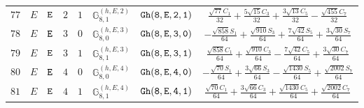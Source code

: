 \documentclass[fleqn,8pt]{jsarticle}
\begin{document}
\begin{table}[ht!]
\begin{center}
\begin{tabular}{cccccccc}
$ 77 $ & $ E $ & $ {\tt E} $ & $ 2 $ & $ 1 $ & $ \mathbb{G}_{8,1}^{(h,E,2)} $ & $ {\tt Gh(8,E,2,1)} $ & $ \frac{\sqrt{77} C_{1}}{32} + \frac{5 \sqrt{15} C_{3}}{32} + \frac{3 \sqrt{13} C_{5}}{32} - \frac{\sqrt{455} C_{7}}{32} $ \\
$ 78 $ & $ E $ & $ {\tt E} $ & $ 3 $ & $ 0 $ & $ \mathbb{G}_{8,0}^{(h,E,3)} $ & $ {\tt Gh(8,E,3,0)} $ & $ - \frac{\sqrt{858} S_{1}}{64} + \frac{\sqrt{910} S_{3}}{64} + \frac{7 \sqrt{42} S_{5}}{64} + \frac{3 \sqrt{30} S_{7}}{64} $ \\
$ 79 $ & $ E $ & $ {\tt E} $ & $ 3 $ & $ 1 $ & $ \mathbb{G}_{8,1}^{(h,E,3)} $ & $ {\tt Gh(8,E,3,1)} $ & $ \frac{\sqrt{858} C_{1}}{64} + \frac{\sqrt{910} C_{3}}{64} - \frac{7 \sqrt{42} C_{5}}{64} + \frac{3 \sqrt{30} C_{7}}{64} $ \\
$ 80 $ & $ E $ & $ {\tt E} $ & $ 4 $ & $ 0 $ & $ \mathbb{G}_{8,0}^{(h,E,4)} $ & $ {\tt Gh(8,E,4,0)} $ & $ - \frac{\sqrt{70} S_{1}}{64} + \frac{3 \sqrt{66} S_{3}}{64} - \frac{\sqrt{1430} S_{5}}{64} + \frac{\sqrt{2002} S_{7}}{64} $ \\
$ 81 $ & $ E $ & $ {\tt E} $ & $ 4 $ & $ 1 $ & $ \mathbb{G}_{8,1}^{(h,E,4)} $ & $ {\tt Gh(8,E,4,1)} $ & $ \frac{\sqrt{70} C_{1}}{64} + \frac{3 \sqrt{66} C_{3}}{64} + \frac{\sqrt{1430} C_{5}}{64} + \frac{\sqrt{2002} C_{7}}{64} $ \\
 \hline \hline
\end{tabular}
\end{center}
\end{table}
\end{document}

